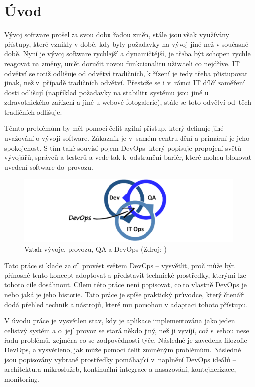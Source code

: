 \documentclass[FM,DP]{tulthesis}
\begin{document}

\chapter{Úvod}

Vývoj software prošel za svou dobu řadou změn, stále jsou však využívány přístupy, které vznikly v době, 
kdy byly požadavky na vývoj jiné než v současné době. Nyní je vývoj software rychlejší a dynamičtější, je třeba
být schopen rychle reagovat na změny, umět doručit novou funkcionalitu uživateli co nejdříve. IT odvětví se
totiž odlišuje od odvětví tradičních, k řízení je tedy třeba přistupovat jinak, než v~případě tradičních odvětví.
Přestože se i v~rámci IT dílčí zaměření dosti odlišují (například požadavky na stabilitu systému jsou
jiné u zdravotnického zařízení a jiné u webové fotogalerie), stále se toto odvětví od~těch tradičních odlišuje.

Těmto problémům by měl pomoci čelit agilní přístup, který definuje jiné uvažování o vývoji software. Zákazník 
je v~samém centru dění a primární je jeho spokojenost. S tím také souvisí pojem DevOps, který popisuje propojení 
světů vývojářů, správců a testerů a vede tak k~odstranění bariér, které mohou blokovat uvedení software 
do~provozu.

\begin{figure}[h]
\center
\includegraphics[width=\textwidth]{devops.png}
\caption{Vztah vývoje, provozu, QA a DevOps (Zdroj: \cite{devops-img})}
\label{devops}
\end{figure}

Tato práce si klade za cíl provést světem DevOps -- vysvětlit, proč může být přínosné tento koncept adoptovat
a představit technické prostředky, kterými lze tohoto cíle dosáhnout. Cílem této práce není popisovat, 
co to vlastně DevOps je nebo jaká je jeho historie. Tato práce je spíše praktický průvodce, který čtenáři dodá 
přehled technik a nástrojů, které mu pomohou v adaptaci tohoto přístupu.

V úvodu práce je vysvětlen stav, kdy je aplikace implementována jako jeden celistvý systém a o~její provoz
se stará někdo jiný, než ji vyvíjí, což s~sebou nese řadu problémů, zejména co se zodpovědnosti
týče. Následně je zavedena filozofie DevOps, a vysvětleno, jak může pomoci čelit zmíněným problémům. 
Následně jsou popisovány vybrané prostředky pomáhající v~naplnění DevOps ideálů -- architektura mikroslužeb, 
kontinuální integrace a nasazování, kontejnerizace, monitoring.
\end{document}
